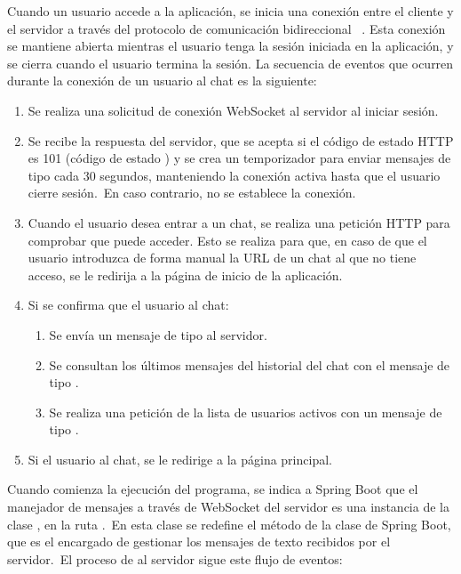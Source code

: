 
Cuando un usuario accede a la aplicación, se inicia una conexión entre el cliente y el servidor a través
del protocolo de comunicación bidireccional ~\cite{RFCWebSocket}.
Esta conexión se mantiene abierta mientras el usuario tenga la sesión iniciada en la aplicación, y se cierra cuando
el usuario termina la sesión.
La secuencia de eventos que ocurren durante la conexión de un usuario al chat es la siguiente:


\begin{enumerate}
	\item Se realiza una solicitud de conexión WebSocket al servidor al iniciar sesión.
	\item Se recibe la respuesta del servidor, que se acepta si el código de estado HTTP es 101 (código de estado
	) y se crea un temporizador para enviar mensajes de tipo 
	cada 30 segundos, manteniendo la conexión activa hasta que el usuario cierre sesión.\ En caso contrario, no se
	establece la conexión.
	\item Cuando el usuario desea entrar a un chat, se realiza una petición HTTP para comprobar que puede acceder.
	Esto se realiza para
	que, en caso de que el usuario introduzca de forma manual la URL de un chat al que no tiene acceso, se le redirija
	a la página de inicio de la aplicación.
	\item Si se confirma que el usuario  al chat:
	\begin{enumerate}
		\item Se envía un mensaje de tipo  al servidor.
		\item Se consultan los últimos mensajes del historial del chat con el mensaje de tipo
		.
		\item Se realiza una petición de la lista de usuarios activos con un mensaje de tipo
		.
	\end{enumerate}
	\item Si el usuario  al chat, se le redirige a la página principal.
\end{enumerate}
\label{itm:frontend-connection-life-cycle}


Cuando comienza la ejecución del programa, se indica a Spring Boot que el manejador de mensajes a través de WebSocket
del servidor es una instancia de la clase , en la ruta
.\ En esta clase se redefine el método  de la clase
 de Spring Boot, que es el encargado de gestionar los mensajes de texto recibidos
por el servidor.\ El proceso de  al servidor sigue este flujo de eventos:

